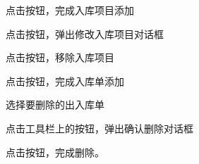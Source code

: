 {{        \item 点击按钮，完成入库项目添加
        \item 点击按钮，弹出修改入库项目对话框
        \item 点击按钮，移除入库项目
        \item 点击按钮，完成入库单添加
    }
    \item {}
    \item {} {}
    \item {} {
        \item  选择要删除的出入库单
        \item  点击工具栏上的按钮，弹出确认删除对话框
        \item  点击按钮，完成删除。
    }
}

